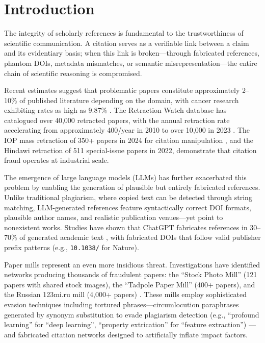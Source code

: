 \documentclass[sigconf,nonacm]{acmart}
\begin{document}

\maketitle

\section{Introduction}
\label{sec:intro}

The integrity of scholarly references is fundamental to the trustworthiness of scientific communication.
A citation serves as a verifiable link between a claim and its evidentiary basis; when this link is broken---through fabricated references, phantom DOIs, metadata mismatches, or semantic misrepresentation---the entire chain of scientific reasoning is compromised.

Recent estimates suggest that problematic papers constitute approximately 2--10\% of published literature depending on the domain, with cancer research exhibiting rates as high as 9.87\% \cite{scancar2025}.
The Retraction Watch database has catalogued over 40,000 retracted papers, with the annual retraction rate accelerating from approximately 400/year in 2010 to over 10,000 in 2023 \cite{vannoorden2023}.
The IOP mass retraction of 350+ papers in 2024 for citation manipulation \cite{else2024iop}, and the Hindawi retraction of 511 special-issue papers in 2022, demonstrate that citation fraud operates at industrial scale.

The emergence of large language models (LLMs) has further exacerbated this problem by enabling the generation of plausible but entirely fabricated references.
Unlike traditional plagiarism, where copied text can be detected through string matching, LLM-generated references feature syntactically correct DOI formats, plausible author names, and realistic publication venues---yet point to nonexistent works.
Studies have shown that ChatGPT fabricates references in 30--70\% of generated academic text \cite{alkaissi2023}, with fabricated DOIs that follow valid publisher prefix patterns (e.g., \texttt{10.1038/} for Nature).

Paper mills represent an even more insidious threat.
Investigations have identified networks producing thousands of fraudulent papers: the ``Stock Photo Mill'' (121 papers with shared stock images), the ``Tadpole Paper Mill'' (400+ papers), and the Russian 123mi.ru mill (4,000+ papers) \cite{byrne2022}.
These mills employ sophisticated evasion techniques including tortured phrases---circumlocution paraphrases generated by synonym substitution to evade plagiarism detection (e.g., ``profound learning'' for ``deep learning'', ``property extrication'' for ``feature extraction'') \cite{cabanac2021}---and fabricated citation networks designed to artificially inflate impact factors.
\end{document}
